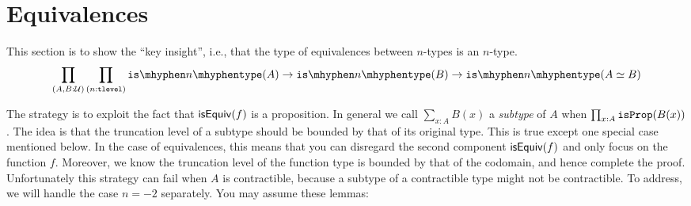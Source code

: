 \documentclass[12pt]{article}
\theoremstyle{plain}
\begin{document}
\section{Equivalences}

This section is to show the ``key insight'',
i.e., that the type of equivalences between $n$-types is an $n$-type.
\[
  \prod_{(A,B:\U)}
  \prod_{(n:\tlevel)}
  \istype{n}(A) \to \istype{n}(B) \to \istype{n}(A \eqv B)
\]

The strategy is to exploit the fact that $\mathsf{isEquiv}(f)$ is a proposition.
In general we call $\sum_{x:A} B(x)$ a \emph{subtype} of $A$
when $\prod_{x:A} \mathtt{isProp}(B(x))$.
The idea is that the truncation level of a subtype
should be bounded by that of its original type.
This is true except one special case mentioned below.
In the case of equivalences, this means that
you can disregard the second component $\mathsf{isEquiv}(f)$
and only focus on the function $f$.
Moreover, we know the truncation level of the function type is bounded by
that of the codomain, and hence complete the proof.
Unfortunately this strategy can fail when $A$ is contractible,
because a subtype of a contractible type might not be contractible.
To address, we will handle the case $n = -2$ separately.
You may assume these lemmas:
\end{document}

